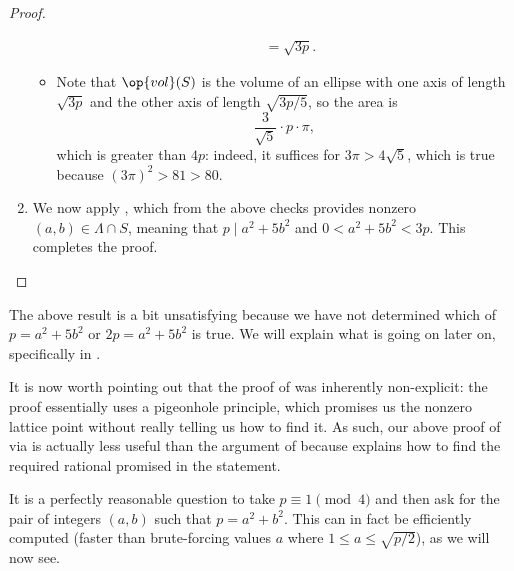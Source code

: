 \documentclass[../notes.tex]{subfiles}
\begin{document}
\begin{proof}
\begin{enumerate}
\begin{itemize}
\begin{align*}
				&= \sqrt{3p}.
			\end{align*}
			\item Note that $\op{vol}(S)$ is the volume of an ellipse with one axis of length $\sqrt{3p}$ and the other axis of length $\sqrt{3p/5}$, so the area is
			\[\frac3{\sqrt5}\cdot p\cdot\pi,\]
			which is greater than $4p$: indeed, it suffices for $3\pi>4\sqrt5$, which is true because $(3\pi)^2>81>80$.
		\end{itemize}
		\item We now apply , which from the above checks provides nonzero $(a,b)\in\Lambda\cap S$, meaning that $p\mid a^2+5b^2$ and $0<a^2+5b^2<3p$. This completes the proof.
		\qedhere
	\end{enumerate}
\end{proof}
The above result is a bit unsatisfying because we have not determined which of $p=a^2+5b^2$ or $2p=a^2+5b^2$ is true. We will explain what is going on later on, specifically in .

It is now worth pointing out that the proof of  was inherently non-explicit: the proof essentially uses a pigeonhole principle, which promises us the nonzero lattice point without really telling us how to find it. As such, our above proof of  via  is actually less useful than the argument of  because  explains how to find the required rational promised in the statement.

It is a perfectly reasonable question to take $p\equiv1\pmod4$ and then ask for the pair of integers $(a,b)$ such that $p=a^2+b^2$. This can in fact be efficiently computed (faster than brute-forcing values $a$ where $1\le a\le\sqrt{p/2}$), as we will now see.
\end{document}
